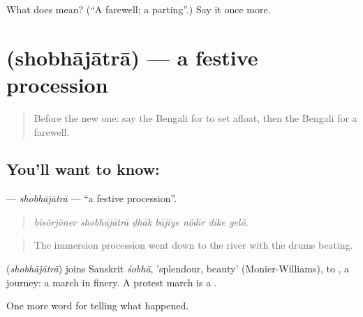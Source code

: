 \begin{tcolorbox}[breakable,colback=teal!4,colframe=teal!35!black,title={Before you move on}]
What does  mean? (\textquotedblleft{}A farewell; a parting\textquotedblright{}.) Say it once more.
\end{tcolorbox}
\section[\texorpdfstring{\bn{শোভাযাত্রা} (shobhājātrā)}{শোভাযাত্রা (shobhājātrā)}]{ (shobhājātrā) — a festive procession}

\label{lesson:BN-C308-shobhajatra}



\begin{quote}
Before the new one: say the Bengali for to set afloat, then the Bengali for a farewell.
\end{quote}

\subsection*{You'll want to know: }
\textbf{} — \emph{shobhājātrā} — \textquotedblleft{}a festive procession\textquotedblright{}.

\begin{quote}
      
\end{quote}

\begin{quote}
\emph{bisôrjôner shobhājātrā ḍhāk bājiye nôdīr dike gelô.}
\end{quote}

\begin{quote}
The immersion procession went down to the river with the drums beating.
\end{quote}

\begin{cousinweb}
\textbf{} (\emph{shobhājātrā}) joins Sanskrit \emph{śobhā}, 'splendour, beauty' (Monier-Williams), to \textbf{}, a journey: a march in finery. A protest march is a \textbf{}.
\end{cousinweb}

\begin{grammarlens}[title={What you've built}]
One more word for telling what happened.
\end{grammarlens}

